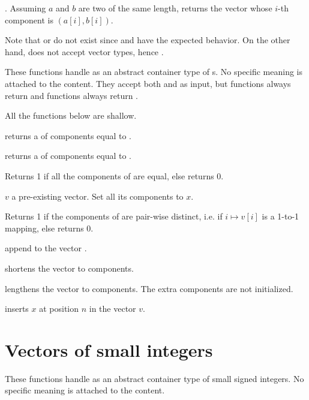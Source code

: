 . Assuming $a$ and $b$ are two 
of the same length, returns the vector whose $i$-th component
is $(a[i], b[i])$.

Note that  or  do not exist since 
and  have the expected behavior. On the other hand,
 does not accept vector types, hence .


These functions handle  as an abstract container type of
s. No specific meaning is attached to the content. They accept both
 and  as input, but  functions always return
 and  functions always return .

 All the functions below are shallow.

 returns a  of  components
equal to .

 returns a  of  components
equal to .

 Returns 1 if all the components of  are
equal, else returns 0.

 $v$ a pre-existing vector. Set all its
components to $x$.

  Returns 1 if the components of  are
pair-wise distinct, i.e. if $i\mapsto v[i]$ is a 1-to-1 mapping, else returns
0.

 append  to the vector .

 shortens the vector  to 
components.

 lengthens the vector 
to  components. The extra components are not initialized.

 inserts $x$ at position $n$ in the vector
$v$.

\section{Vectors of small integers}


These functions handle  as an abstract container type
of small signed integers. No specific meaning is attached to the content.

